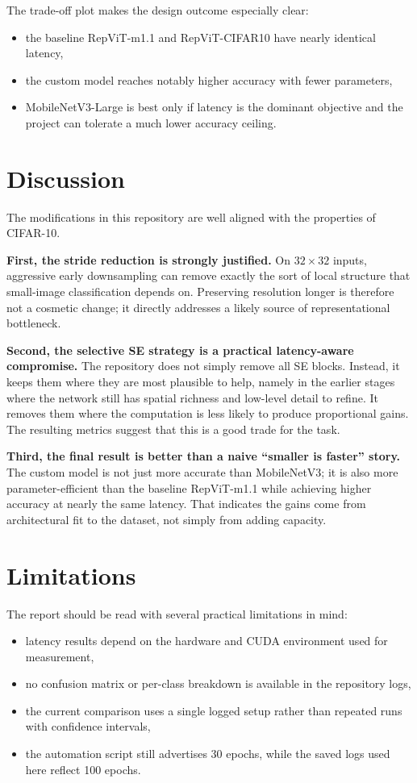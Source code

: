 \documentclass[11pt,a4paper]{article}
\begin{document}
The trade-off plot makes the design outcome especially clear:
\begin{itemize}[leftmargin=1.5em]
    \item the baseline RepViT-m1.1 and RepViT-CIFAR10 have nearly identical latency,
    \item the custom model reaches notably higher accuracy with fewer parameters,
    \item MobileNetV3-Large is best only if latency is the dominant objective and the project can tolerate a much lower accuracy ceiling.
\end{itemize}

\section{Discussion}

The modifications in this repository are well aligned with the properties of CIFAR-10.

\textbf{First, the stride reduction is strongly justified.} On \(32 \times 32\) inputs, aggressive early downsampling can remove exactly the sort of local structure that small-image classification depends on. Preserving resolution longer is therefore not a cosmetic change; it directly addresses a likely source of representational bottleneck.

\textbf{Second, the selective SE strategy is a practical latency-aware compromise.} The repository does not simply remove all SE blocks. Instead, it keeps them where they are most plausible to help, namely in the earlier stages where the network still has spatial richness and low-level detail to refine. It removes them where the computation is less likely to produce proportional gains. The resulting metrics suggest that this is a good trade for the task.

\textbf{Third, the final result is better than a naive ``smaller is faster'' story.} The custom model is not just more accurate than MobileNetV3; it is also more parameter-efficient than the baseline RepViT-m1.1 while achieving higher accuracy at nearly the same latency. That indicates the gains come from architectural fit to the dataset, not simply from adding capacity.

\section{Limitations}

The report should be read with several practical limitations in mind:
\begin{itemize}[leftmargin=1.5em]
    \item latency results depend on the hardware and CUDA environment used for measurement,
    \item no confusion matrix or per-class breakdown is available in the repository logs,
    \item the current comparison uses a single logged setup rather than repeated runs with confidence intervals,
    \item the automation script still advertises 30 epochs, while the saved logs used here reflect 100 epochs.
\end{itemize}
\end{document}
